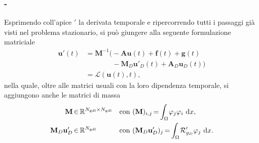 \documentclass[11pt]{beamer}
\newcommand{\de}{\mathrm{d}}
\newcommand{\Ngdl}{N_{\text{gdl}}}
\begin{document}
            \begin{frame}\frametitle{\insertpart{} - \insertsection{}}
                Esprimendo coll'apice $'$ la derivata temporale e ripercorrendo tutti i passaggi già visti nel problema stazionario, si può giungere alla seguente formulazione matriciale                
                \begin{equation*}
                    \begin{aligned}
                        \mathbf u'(t)&=
                        \mathbf M^{-1}\big(-\mathbf A\mathbf u(t)+\mathbf f(t)+\mathbf g(t)\\
                        &\qquad\quad\;\;\ -\mathbf M_D\mathbf u'_D(t)+\mathbf A_D\mathbf u_D(t)\big)\\
                        &=\mathcal L(\mathbf u(t),t),
                    \end{aligned}
                    \label{eqSistemaAlgebricoConDerivataTemporale}
                \end{equation*}
                nella quale, oltre alle matrici usuali con la loro dipendenza temporale, si aggiungono anche le matrici di massa
                \begin{equation*}
                    \setlength{\thinmuskip}{1mu}
                    \setlength{\medmuskip}{2mu}
                    \setlength{\thickmuskip}{3mu}
                    \begin{aligned}
                        \mathbf M&\in\mathbb R^{\Ngdl\times\Ngdl}
                        &&\text{con}\ (\mathbf M)_{i,j}
                        =\int_\Omega\mathcal\varphi_j\varphi_i\ \de x,\\
                        \mathbf M_D\mathbf u'_D&\in\mathbb R^{\Ngdl}
                        &&\text{con}\ (\mathbf M_D\mathbf u'_D)_j
                        =\int_\Omega\mathcal R'_{g_D}\varphi_j\ \de x.
                    \end{aligned}
                    \label{eqSistemaAlgebricoDefinizioneMatriciPE}
                \end{equation*}
            \end{frame}
\end{document}
